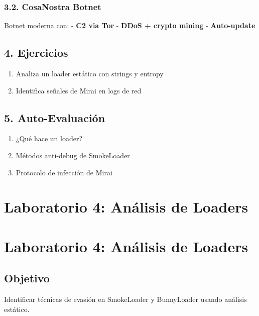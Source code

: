 \documentclass[
  letterpaper,
]{report}
\providecommand{\tightlist}{%
  \setlength{\itemsep}{0pt}\setlength{\parskip}{0pt}}
\begin{document}
\subsection{3.2. CosaNostra Botnet}\label{cosanostra-botnet}

Botnet moderna con: - \textbf{C2 via Tor} - \textbf{DDoS + crypto
mining} - \textbf{Auto-update}

\section{4. Ejercicios}\label{ejercicios-2}

\begin{enumerate}
\def\labelenumi{\arabic{enumi}.}
\tightlist
\item
  Analiza un loader estático con strings y entropy
\item
  Identifica señales de Mirai en logs de red
\end{enumerate}

\section{5. Auto-Evaluación}\label{auto-evaluaciuxf3n-3}

\begin{enumerate}
\def\labelenumi{\arabic{enumi}.}
\tightlist
\item
  ¿Qué hace un loader?
\item
  Métodos anti-debug de SmokeLoader
\item
  Protocolo de infección de Mirai
\end{enumerate}

\chapter{Laboratorio 4: Análisis de
Loaders}\label{laboratorio-4-anuxe1lisis-de-loaders}

\chapter{Laboratorio 4: Análisis de
Loaders}\label{laboratorio-4-anuxe1lisis-de-loaders-1}

\section{Objetivo}\label{objetivo-3}

Identificar técnicas de evasión en SmokeLoader y BunnyLoader usando
análisis estático.
\end{document}
